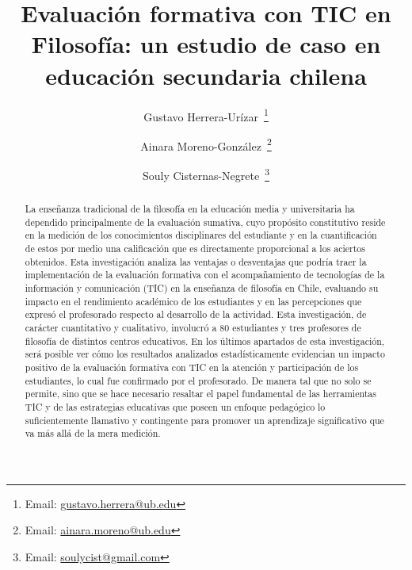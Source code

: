 \documentclass[spanish]{textolivre}
\title{Evaluación formativa con TIC en Filosofía: un estudio de caso en educación secundaria chilena}
\author[1]{Gustavo Herrera-Urízar~\orcid{0000-0003-3546-8976}\thanks{Email: \href{mailto:gustavo.herrera@ub.edu}{gustavo.herrera@ub.edu}}}
\author[1]{Ainara Moreno-González~\orcid{0000-0002-8183-5434}\thanks{Email: \href{mailto:ainara.moreno@ub.edu}{ainara.moreno@ub.edu}}}
\author[2]{Souly Cisternas-Negrete~\orcid{0009-0006-4597-2569}\thanks{Email: \href{mailto:soulycist@gmail.com}{soulycist@gmail.com}}}
\affil[1]{Universidad de Barcelona, Barcelona, España.}
\affil[2]{Pontificia Universidad Católica de Valparaíso, Valparaíso, Chile.}
\begin{document}
\maketitle

\begin{polyabstract}
\begin{abstract}
La enseñanza tradicional de la filosofía en la educación media y universitaria ha dependido principalmente de la evaluación sumativa, cuyo propósito constitutivo reside en la medición de los conocimientos disciplinares del estudiante y en la cuantificación de estos por medio una calificación que es directamente proporcional a los aciertos obtenidos. Esta investigación analiza las ventajas o desventajas que podría traer la implementación de la evaluación formativa con el acompañamiento de tecnologías de la información y comunicación (TIC) en la enseñanza de filosofía en Chile, evaluando su impacto en el rendimiento académico de los estudiantes y en las percepciones que expresó el profesorado respecto al desarrollo de la actividad. Esta investigación, de carácter cuantitativo y cualitativo, involucró a 80 estudiantes y tres profesores de filosofía de distintos centros educativos. En los últimos apartados de esta investigación, será posible ver cómo los resultados analizados estadísticamente evidencian un impacto positivo de la evaluación formativa con TIC en la atención y participación de los estudiantes, lo cual fue confirmado por el profesorado. De manera tal que no solo se permite, sino que se hace necesario resaltar el papel fundamental de las herramientas TIC y de las estrategias educativas que poseen un enfoque pedagógico lo suficientemente llamativo y contingente para promover un aprendizaje significativo que va más allá de la mera medición.

\end{abstract}


\end{polyabstract}
\end{document}

